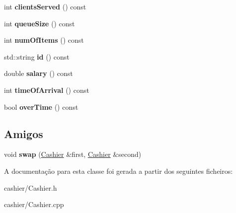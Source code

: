 \begin{DoxyCompactItemize}
\item 
\hypertarget{classCashier_ae6d59b96dd0a97414a883056487f9934}{int {\bfseries clients\-Served} () const }\label{de/d14/classCashier_ae6d59b96dd0a97414a883056487f9934}

\item 
\hypertarget{classCashier_a6c4e3d00ebeb1e9af88feb6ff2285369}{int {\bfseries queue\-Size} () const }\label{de/d14/classCashier_a6c4e3d00ebeb1e9af88feb6ff2285369}

\item 
\hypertarget{classCashier_a20019398d52b20997fa109228268b583}{int {\bfseries num\-Of\-Items} () const }\label{de/d14/classCashier_a20019398d52b20997fa109228268b583}

\item 
\hypertarget{classCashier_a5c32d6426d9e272649151a965564afb1}{std\-::string {\bfseries id} () const }\label{de/d14/classCashier_a5c32d6426d9e272649151a965564afb1}

\item 
\hypertarget{classCashier_ad394576caf7eb468ce5684181b53c83f}{double {\bfseries salary} () const }\label{de/d14/classCashier_ad394576caf7eb468ce5684181b53c83f}

\item 
\hypertarget{classCashier_ac0bc4c8f7d5317f296a6ed103a75dfe4}{int {\bfseries time\-Of\-Arrival} () const }\label{de/d14/classCashier_ac0bc4c8f7d5317f296a6ed103a75dfe4}

\item 
\hypertarget{classCashier_a61d85cd680cc3611c5e9fa6d12544236}{bool {\bfseries over\-Time} () const }\label{de/d14/classCashier_a61d85cd680cc3611c5e9fa6d12544236}

\end{DoxyCompactItemize}
\subsection*{Amigos}
\begin{DoxyCompactItemize}
\item 
\hypertarget{classCashier_a34bcc8f6f2057300c0eba451506915d1}{void {\bfseries swap} (\hyperlink{classCashier}{Cashier} \&first, \hyperlink{classCashier}{Cashier} \&second)}\label{de/d14/classCashier_a34bcc8f6f2057300c0eba451506915d1}

\end{DoxyCompactItemize}


A documentação para esta classe foi gerada a partir dos seguintes ficheiros\-:\begin{DoxyCompactItemize}
\item 
cashier/Cashier.\-h\item 
cashier/Cashier.\-cpp\end{DoxyCompactItemize}
